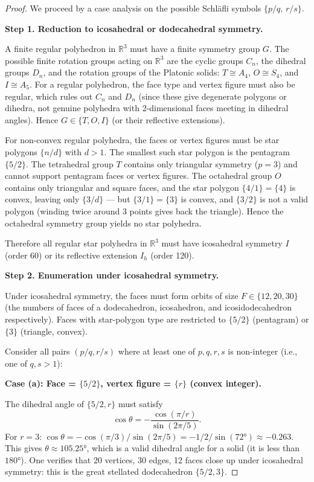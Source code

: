 \begin{proof}
We proceed by a case analysis on the possible Schläfli symbols
\(\{p/q,\,r/s\}\).

\medskip
\noindent\textbf{Step 1. Reduction to icosahedral or dodecahedral symmetry.}

A finite regular polyhedron in \(\mathbb{R}^3\) must have a
finite symmetry group $G$.  The possible finite rotation
groups acting on \(\mathbb{R}^3\) are the cyclic groups
$C_n$, the dihedral groups $D_n$, and the rotation groups of
the Platonic solids: $T \cong A_4$, $O \cong S_4$, and
$I \cong A_5$.  For a regular polyhedron, the face type and
vertex figure must also be regular, which rules out $C_n$ and
$D_n$ (since these give degenerate polygons or dihedra, not
genuine polyhedra with 2-dimensional faces meeting in dihedral
angles).  Hence $G \in \{T, O, I\}$ (or their reflective
extensions).

For non-convex regular polyhedra, the faces or vertex figures
must be star polygons $\{n/d\}$ with $d > 1$.  The smallest
such star polygon is the pentagram $\{5/2\}$.  The tetrahedral
group $T$ contains only triangular symmetry ($p=3$) and cannot
support pentagram faces or vertex figures.  The octahedral group
$O$ contains only triangular and square faces, and the star
polygon $\{4/1\} = \{4\}$ is convex, leaving only $\{3/d\}$ —
but $\{3/1\} = \{3\}$ is convex, and $\{3/2\}$ is not a valid
polygon (winding twice around 3 points gives back the triangle).
Hence the octahedral symmetry group yields no star polyhedra.

Therefore all regular star polyhedra in $\mathbb{R}^3$ must
have icosahedral symmetry $I$ (order 60) or its reflective
extension $I_h$ (order 120).

\medskip
\noindent\textbf{Step 2. Enumeration under icosahedral symmetry.}

Under icosahedral symmetry, the faces must form orbits of size
$F \in \{12, 20, 30\}$ (the numbers of faces of a
dodecahedron, icosahedron, and icosidodecahedron respectively).
Faces with star-polygon type are restricted to $\{5/2\}$ (pentagram)
or $\{3\}$ (triangle, convex).

Consider all pairs $(p/q, r/s)$ where at least one of
$p, q, r, s$ is non-integer (i.e., one of $q, s > 1$):

\medskip
\noindent\textbf{Case (a): Face = $\{5/2\}$, vertex figure = $\{r\}$ (convex integer).}

The dihedral angle of $\{5/2, r\}$ must satisfy
\[
  \cos\theta = -\frac{\cos(\pi/r)}{\sin(2\pi/5)}.
\]
For $r = 3$: $\cos\theta = -\cos(\pi/3) / \sin(2\pi/5) = -1/2 / \sin(72°) \approx -0.263$.
This gives $\theta \approx 105.25°$, which is a valid
dihedral angle for a solid (it is less than $180°$).
One verifies that 20 vertices, 30 edges, 12 faces close up
under icosahedral symmetry: this is the great stellated
dodecahedron $\{5/2,3\}$. \checkmark


\end{proof}
